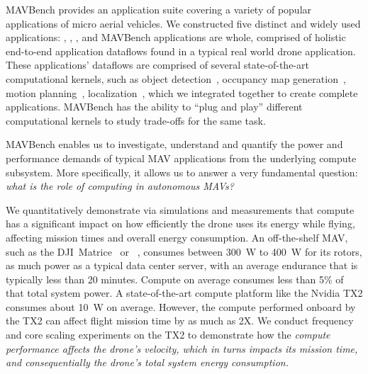 MAVBench provides an application suite covering a variety of popular applications of micro aerial vehicles. We constructed five distinct and widely used applications: , , ,  and  MAVBench applications are whole, comprised of holistic end-to-end application dataflows found in a typical real world drone application. These applications' dataflows are comprised of several state-of-the-art computational kernels, such as object detection~\cite{yolo16,hog}, occupancy map generation~\cite{octomap}, motion planning~\cite{ompl}, localization~\cite{orbslam2,vins-mono}, which we integrated together to create complete applications. MAVBench has the ability to ``plug and play'' different computational kernels to study trade-offs for the same task.


MAVBench enables us to investigate, understand and quantify the power and performance demands of typical MAV applications from the underlying compute subsystem. More specifically, it allows us to answer a very fundamental question: \emph{what is the role of computing in autonomous MAVs?} 

We quantitatively demonstrate via simulations and measurements that compute has a significant impact on how efficiently the drone uses its energy while flying, affecting mission times and overall energy consumption. An off-the-shelf MAV, such as the DJI~Matrice~\cite{dji-matrice} or \solo~\cite{solo3DR}, consumes between 300~W to 400~W for its rotors, as much power as a typical data center server, with an average endurance that is typically less than 20 minutes. Compute on average consumes less than 5\% of that total system power.  A state-of-the-art compute platform like the Nvidia TX2 consumes about 10~W on average. However, the compute performed onboard by the TX2 can affect flight mission time by as much as 2X. We conduct frequency and core scaling experiments on the TX2 to demonstrate how the \emph{compute performance affects the drone's velocity, which in turns impacts its mission time, and consequentially the drone's total system energy consumption.}

